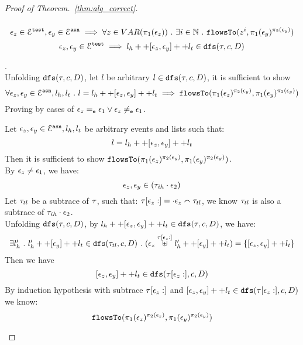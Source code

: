 \documentclass[a4paper,11pt]{article}
\begin{document}
\begin{proof}[Proof of Theorem.~\ref{thm:alg_correct}]
\begin{case}
\begin{equation}
\end{equation}
%
\begin{equation}
  \mathtt{\epsilon}_z \in \mathcal{E}^{\mathtt{{test}}}, \mathtt{\epsilon}_y \in \mathcal{E}^{\mathtt{{asn}}}
  \implies \forall z \in VAR(\pi_1(\mathtt{\epsilon}_z)) ~.~ \exists i \in\mathbb{N} ~.~
  \mathtt{flowsTo}(z^i, \pi_1(\mathtt{\epsilon}_y)^{\pi_2(\mathtt{\epsilon}_y)})
\end{equation}
%
\begin{equation}
  \mathtt{\epsilon}_z, \mathtt{\epsilon}_y \in \mathcal{E}^{\mathtt{{test}}}
  \implies l_h ++ [\mathtt{\epsilon}_z, \mathtt{\epsilon}_y] ++ l_t \in \mathtt{dfs}(\mathtt{\tau}, c, D)
\end{equation}
\begin{subcase}.
\\
Unfolding $\mathtt{dfs}(\mathtt{\tau}, c, D)$, let $l$ be arbitrary $l \in  \mathtt{dfs}(\mathtt{\tau}, c, D)$, it is sufficient to show 
\[
   \forall \mathtt{\epsilon}_z, \mathtt{\epsilon}_y \in \mathcal{E}^{\mathtt{{asn}}}, l_h, l_t ~.~ 
   l = l_h ++ [\mathtt{\epsilon}_z, \mathtt{\epsilon}_y] ++ l_t 
   \implies \mathtt{flowsTo}(\pi_1(\mathtt{\epsilon}_z)^{\pi_2(\mathtt{\epsilon}_y)}, \pi_1(\mathtt{\epsilon}_y)^{\pi_2(\mathtt{\epsilon}_y)})
\] 
%
Proving by cases of $\mathtt{\epsilon}_z =_{\mathtt{e}} \mathtt{\epsilon}_1 \lor \mathtt{\epsilon}_z \neq_{\mathtt{e}} \mathtt{\epsilon}_1$.
\begin{subsubcase}
Let $\mathtt{\epsilon}_z, \mathtt{\epsilon}_y \in \mathcal{E}^{\mathtt{{asn}}}, l_h, l_t$ be arbitrary events and lists such that:
\[
  l = l_h ++ [\mathtt{\epsilon}_z, \mathtt{\epsilon}_y] ++ l_t 
\]
%
Then it is sufficient to show $\mathtt{flowsTo}(\pi_1(\mathtt{\epsilon}_z)^{\pi_2(\mathtt{\epsilon}_y)}, \pi_1(\mathtt{\epsilon}_y)^{\pi_2(\mathtt{\epsilon}_y)})$.
\\
By $\mathtt{\epsilon}_z \neq \mathtt{\epsilon}_1$, we have:
\[
  \mathtt{\epsilon}_z, \mathtt{\epsilon}_y \in (\mathtt{\tau}_{ih} \cdot \mathtt{\epsilon}_2)
\]
%
Let $\mathtt{\tau}_{tl}$ be a subtrace  of $\mathtt{\tau}$, such that: 
$\mathtt{\tau}[\mathtt{\epsilon}_z:] = \cdot \mathtt{\epsilon}_z \smallfrown \mathtt{\tau}_{tl}$, we know $\mathtt{\tau}_{tl}$ is also a subtrace  of $\mathtt{\tau}_{ih} \cdot \mathtt{\epsilon}_2$.
\\
Unfolding $\mathtt{dfs}(\mathtt{\tau}, c, D)$, by $l_h ++ [\mathtt{\epsilon}_z, \mathtt{\epsilon}_y] ++ l_t  \in\mathtt{dfs}(\mathtt{\tau}, c, D)$, we have:
\[
\begin{array}{l}
  \exists l_{h}' ~.~ l_{h}' ++ [\mathtt{\epsilon}_y] ++ l_t \in \mathtt{dfs}( \mathtt{\tau}_{tl}, c, D) ~.~
  (\mathtt{\epsilon}_z \stackrel{\mathtt{\tau}[\mathtt{\epsilon}_z:]}{\uplus} l_{h}' ++ [\mathtt{\epsilon}_y] ++ l_t) = \{[\mathtt{\epsilon}_z, \mathtt{\epsilon}_y] ++ l_t\} 
  \end{array}
\]
%
Then
we have
\[
  [\mathtt{\epsilon}_z, \mathtt{\epsilon}_y] ++ l_t 
  \in \mathtt{dfs}(\mathtt{\tau}[\mathtt{\epsilon}_z:], c, D)
\]
%
%
By induction hypothesis with subtrace $\mathtt{\tau}[\mathtt{\epsilon}_z:]$ and $[\mathtt{\epsilon}_z, \mathtt{\epsilon}_y] ++ l_t 
  \in \mathtt{dfs}(\mathtt{\tau}[\mathtt{\epsilon}_z:], c, D)$ we know:
\[
  \mathtt{flowsTo}(\pi_1(\mathtt{\epsilon}_z)^{\pi_2(\mathtt{\epsilon}_z)}, \pi_1(\mathtt{\epsilon}_y)^{\pi_2(\mathtt{\epsilon}_y)})
\]
\end{subsubcase}
\end{subcase}
\end{case}
\end{proof}
\end{document}
